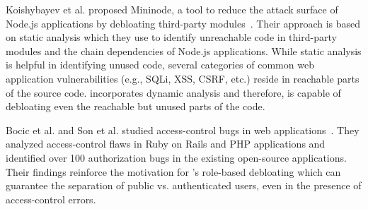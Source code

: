 Koishybayev et al. proposed Mininode, a tool to reduce the attack surface of Node.js applications by debloating third-party modules~\cite{mininode}. 
Their approach is based on static analysis which they use to identify unreachable code in third-party modules and the chain dependencies of Node.js applications. 
While static analysis is helpful in identifying unused code, several categories of common web application vulnerabilities (e.g., SQLi, XSS, CSRF, etc.) reside in reachable parts of the source code. 
\sys{} incorporates dynamic analysis and therefore, is capable of debloating even the reachable but unused parts of the code. 

Bocic et al. and Son et al. studied access-control bugs in web applications~\cite{7582754, son2013fix}. 
They analyzed access-control flaws in Ruby on Rails and PHP applications and identified over 100 authorization bugs in the existing open-source applications. Their findings reinforce the motivation for \sys{}'s role-based debloating which can guarantee the separation of public vs. authenticated users, even in the presence of access-control errors.